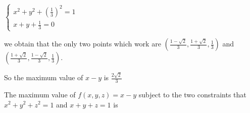 \documentclass{ximera}
\begin{document}
\begin{question}
\begin{hint}
			\(
				\begin{cases}
					x^2+y^2+(\frac{1}{3})^2 = 1\\
					x+y+\frac{1}{3} = 0
				\end{cases}
			\) 
			
			we obtain that the only two points which work are $(\frac{1-\sqrt{2}}{3},\frac{1+\sqrt{2}}{3},\frac{1}{3})$ and $(\frac{1+\sqrt{2}}{3},\frac{1-\sqrt{2}}{3},\frac{1}{3})$.
		\end{hint}
		\begin{hint}
			So the maximum value of $x-y$ is $\frac{2\sqrt{2}}{3}$
		\end{hint}
		The maximum value of  $f(x,y,z) = x-y$ subject to the two constraints that $x^2+y^2+z^2 = 1$ and $x+y+z=1$ is 

	\end{question}		
		
\end{document}
